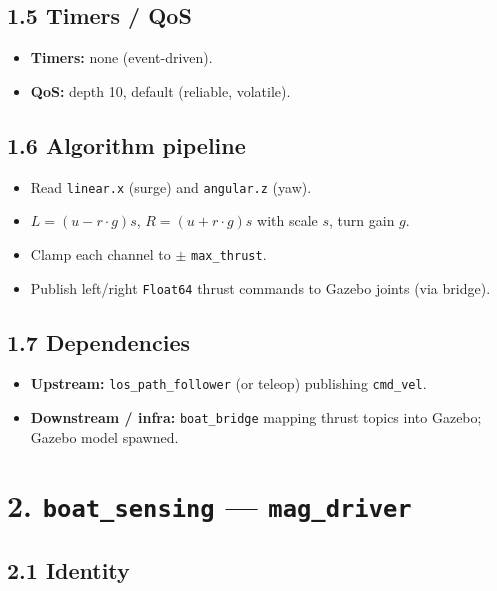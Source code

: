 \subsection{1.5 Timers / QoS}


\begin{itemize}[leftmargin=*]
\item \textbf{Timers:} none (event-driven).
\item \textbf{QoS:} depth 10, default (reliable, volatile).
\end{itemize}


\subsection{1.6 Algorithm pipeline}


\begin{itemize}[leftmargin=*]
\item Read \texttt{linear.x} (surge) and \texttt{angular.z} (yaw).
\item \(L = (u - r \cdot g) s\), \(R = (u + r \cdot g) s\) with scale \(s\), turn gain \(g\).
\item Clamp each channel to \(\pm\) \texttt{max\_thrust}.
\item Publish left/right \texttt{Float64} thrust commands to Gazebo joints (via bridge).
\end{itemize}


\subsection{1.7 Dependencies}


\begin{itemize}[leftmargin=*]
\item \textbf{Upstream:} \texttt{los\_path\_follower} (or teleop) publishing \texttt{cmd\_vel}.
\item \textbf{Downstream / infra:} \texttt{boat\_bridge} mapping thrust topics into Gazebo; Gazebo model spawned.
\end{itemize}




\section{2. \texttt{boat\_sensing} --- \texttt{mag\_driver}}


\subsection{2.1 Identity}


